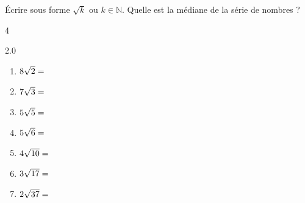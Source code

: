 \documentclass[main.tex]{subfiles}
\begin{document}
\begin{exercise}[Comparer]  
	Écrire sous forme $\sqrt{k}$ ou $k\in\mathbb{N}$. Quelle est la médiane de la série de nombres ?\vspace{-0.5em}  
	\begin{multicols}{4}
		\begin{spacing}{2.0}
		\begin{enumerate}[label={}, leftmargin=*] 
			\item $8\sqrt{2}=\dotfill $
			\item $7\sqrt{3}=\dotfill $
			\item $5\sqrt{5}=\dotfill $
			\item $5\sqrt{6}=\dotfill $ 
			\item $4\sqrt{10}=\dotfill $
			\item $3\sqrt{17}=\dotfill $ 
			\item $2\sqrt{37}=\dotfill $
		\end{enumerate}
	\end{spacing}
	\end{multicols}
	
\end{exercise} 
\end{document}
